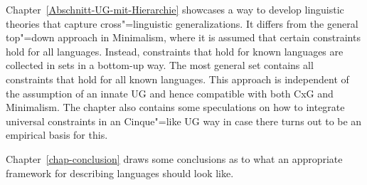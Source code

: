 Chapter~\ref{Abschnitt-UG-mit-Hierarchie} showcases a way to develop linguistic theories that capture
cross"=linguistic generalizations. It differs from the general top"=down approach in Minimalism,
where it is assumed that certain constraints hold for all languages. Instead, constraints that hold
for known languages are collected in sets in a bottom-up way. The most general set contains all
constraints that hold for all known languages. This approach is independent of the assumption of an
innate UG and hence compatible with both CxG and Minimalism. The chapter also contains some
speculations on how to integrate universal constraints in an Cinque"=like UG way in case there turns
out to be an empirical basis for this.

Chapter~\ref{chap-conclusion} draws some conclusions as to what an appropriate framework for
describing languages should look like.

  




